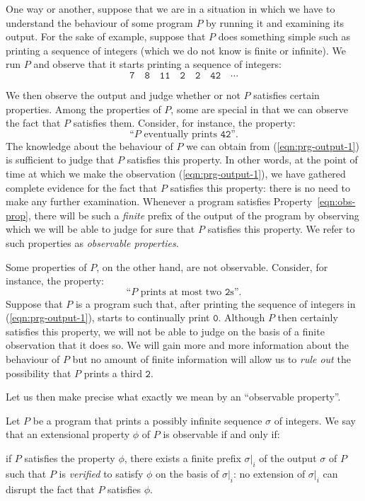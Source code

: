 One way or another, suppose that we are in a situation in which we have to understand the
behaviour of some program $P$ by running it and examining its output. For the sake of
example, suppose that $P$ does something simple such as printing a sequence of integers
(which we do not know is finite or infinite). We run $P$ and observe that it starts
printing a sequence of integers:
\begin{equation}\label{eqn:prg-output-1}
  \mathtt{7 \quad 8 \quad 11 \quad 2 \quad 2 \quad 42 \quad \cdots}
\end{equation}

We then observe the output and judge whether or not $P$ satisfies certain properties.
Among the properties of $P$, some are special in that we can observe the fact that $P$
satisfies them. Consider, for instance, the property:
\begin{equation}\label{eqn:obs-prop}
  \text{``$P$ eventually prints $\mathtt{42}$''}.
\end{equation}
The knowledge about the behaviour of $P$ we can obtain from (\ref{eqn:prg-output-1}) is
sufficient to judge that $P$ satisfies this property. In other words, at the point of time
at which we make the observation (\ref{eqn:prg-output-1}), we have gathered complete
evidence for the fact that $P$ satisfies this property: there is no need to make any
further examination. Whenever a program satisfies Property~\ref{eqn:obs-prop}, there will
be such a \emph{finite} prefix of the output of the program by observing which we will be
able to judge for sure that $P$ satisfies this property. We refer to such properties as
\emph{observable properties}.

Some properties of $P$, on the other hand, are not observable. Consider, for instance,
the property:
\begin{equation}\label{eqn:non-obs-prop}
  \text{``$P$ prints at most two $\mathtt{2}$s''}.
\end{equation}
Suppose that $P$ is a program such that, after printing the sequence of integers in
(\ref{eqn:prg-output-1}), starts to continually print $\mathtt{0}$. Although $P$ then
certainly satisfies this property, we will not be able to judge on the basis of a finite
observation that it does so. We will gain more and more information about the behaviour of
$P$ but no amount of finite information will allow us to \emph{rule out} the possibility
that $P$ prints a third $\mathtt{2}$.

Let us then make precise what exactly we mean by an ``observable property''.
\begin{defn}
  Let $P$ be a program that prints a possibly infinite sequence $\sigma$ of integers. We say
  that an extensional property $\phi$ of $P$ is observable if and only if:
  \begin{center}
    if $P$ satisfies the property $\phi$, there exists a finite prefix $\sigma|_i$ of the output
    $\sigma$ of $P$ such that $P$ is \emph{verified} to satisfy $\phi$ on the basis of $\sigma|_i$:
    no extension of $\sigma|_i$ can disrupt the fact that $P$ satisfies $\phi$.
  \end{center}
\end{defn}

